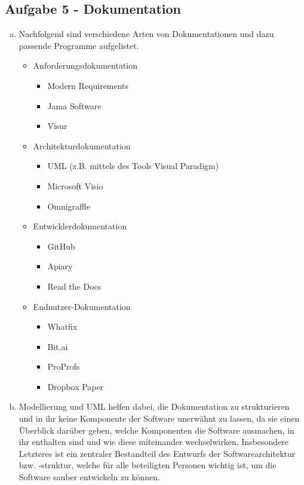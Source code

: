 \subsection{Aufgabe 5 - Dokumentation}
\begin{enumerate}[(a)]
	\item Nachfolgend sind verschiedene Arten von Dokumentationen und dazu passende Programme aufgelistet.
	\begin{itemize}
		\item Anforderungsdokumentation
		\begin{itemize}
			\item Modern Requirements
			\item Jama Software
			\item Visur
		\end{itemize}
		\item Architekturdokumentation 
		\begin{itemize}
			\item UML (z.B. mittels des Tools Visual Paradigm)
			\item Microsoft Visio
			\item Omnigraffle
		\end{itemize}
		\item  Entwicklerdokumentation
		\begin{itemize}
			\item GitHub
			\item Apiary
			\item Read the Docs
		\end{itemize}
		\item Endnutzer-Dokumentation
		\begin{itemize}
			\item Whatfix
			\item Bit.ai
			\item ProProfs
			\item Dropbox Paper
		\end{itemize}
	\end{itemize}
	
	\item Modellierung und UML helfen dabei, die Dokumentation zu strukturieren und in ihr keine Komponente der Software unerwähnt zu lassen, da sie einen Überblick darüber geben, welche Komponenten die Software ausmachen, in ihr enthalten sind und wie diese miteinander wechselwirken. Insbesondere Letzteres ist ein zentraler Bestandteil des Entwurfs der Softwarearchitektur bzw. -struktur, welche für alle beteiligten Personen wichtig ist, um die Software sauber entwickeln zu können.
\end{enumerate}
